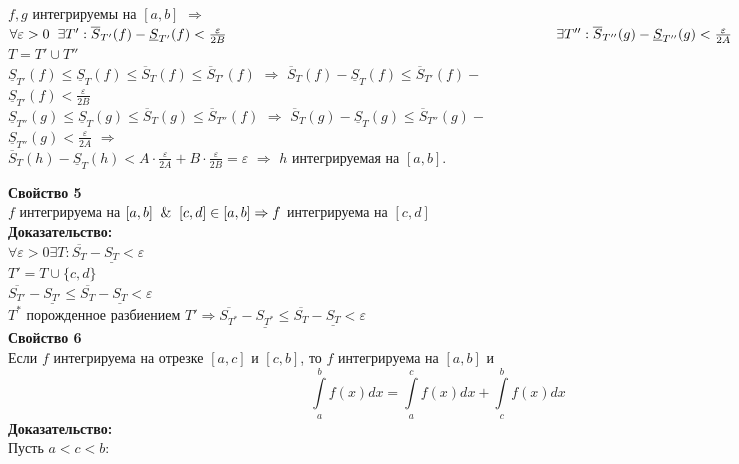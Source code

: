 \documentclass[a4paper,12pt]{article} %
\begin{document}
\begin{enumerate}
    $ f, g $ интегрируемы на $ [a, b] $ $ \Rightarrow $ $ \forall \varepsilon > 0 \hspace*{2mm} \exists T' : \overline{S}_{T'}(f) - \underline{S}_{T'} (f) < \frac {\varepsilon}{2B} \\ [2 mm] \hspace*{83mm} \exists T'' : \overline{S}_{T''}(g) - \underline{S}_{T''} (g) < \frac {\varepsilon}{2A} $ \\ [3 mm]
    $ T = T' \cup T''$ \\ [2 mm]
    $ \underline{S}_{T'}(f) \leq \underline{S}_{T}(f) \leq \overline{S}_{T}(f) \leq \overline{S}_{T'}(f) $ $ \Rightarrow $ $\overline{S}_{T}(f) - \underline{S}_{T} (f)  \leq \overline{S}_{T'}(f) - $ \\ [2mm] $\underline{S}_{T'} (f) < \frac {\varepsilon}{2B} $ \\ [2 mm]
    $ \underline{S}_{T''}(g) \leq \underline{S}_{T}(g) \leq \overline{S}_{T}(g) \leq \overline{S}_{T''}(f) $ $ \Rightarrow $ $\overline{S}_{T}(g) - \underline{S}_{T} (g)  \leq \overline{S}_{T''}(g) - $ \\ [2mm] $\underline{S}_{T''} (g) < \frac {\varepsilon}{2A} $ $ \Rightarrow $ \\ [3 mm]
    $\overline{S}_{T}(h) - \underline{S}_{T} (h) < A \cdot \frac {\varepsilon}{2A} + B \cdot \frac{\varepsilon}{2B} = \varepsilon$ $\Rightarrow$ $ h $ интегрируемая на $ [a, b] $.
    
    \textbf{Свойство 5}\\[5mm] $f$ интегрируема на $[a,b] \And [c,d] \in [a,b]\Rightarrow f$ интегрируема на $[c,d]$\\ [5mm]
    \textbf{Доказательство:}\\[2mm]
    $\forall \varepsilon > 0 \exists T: \overline{S_T}- \underline{S_T}< \varepsilon$\\[2mm]
    $T' = T \cup \{c,d\}$\\[2mm]
    $\overline{S_{T'}}-\underline{S_{T'}}\leq \overline{S_T}-\underline{S_T} < \varepsilon$\\[2mm]
    $T^*$ порожденное разбиением $T' \Rightarrow \overline{S_{T^*}}- \underline{S_{T^*}}\leq  \overline{S_T}-\underline{S_T} < \varepsilon$\\[2mm]
    
    \textbf{Свойство 6}\\[5mm] Если $ f $ интегрируема на отрезке $ [a, c]  $ и $ [c, b]  $, то $ f $ интегрируема на $ [a, b]  $ и \vspace*{1mm} \hspace*{50mm} $$\int\limits_a^b f(x)dx = \int\limits_a^c f(x)dx + \int\limits_c^b f(x)dx $$ \newline
    \textbf{Доказательство:} \\[3 mm]
    \hspace*{5mm} Пусть $ a < c < b$: \\[2 mm]


\end{enumerate}
\end{document}
